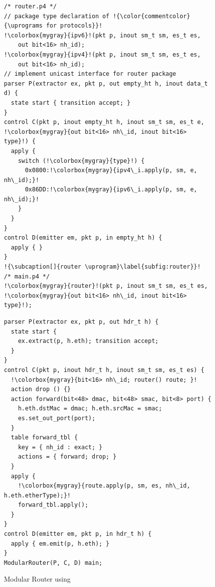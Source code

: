 \documentclass[letterpaper,twocolumn,10pt]{article}
\begin{document}
\begin{figure}[!ht]
\noindent \begin{minipage}[t]{.50\textwidth}
\begin{lstlisting}[frame=none, escapechar=!]
/* router.p4 */
// package type declaration of !{\color{commentcolor}{\uprograms for protocols}}! 
!\colorbox{mygray}{ipv6}!(pkt p, inout sm_t sm, es_t es, 
    out bit<16> nh_id);
!\colorbox{mygray}{ipv4}!(pkt p, inout sm_t sm, es_t es, 
    out bit<16> nh_id);
// implement unicast interface for router package
parser P(extractor ex, pkt p, out empty_ht h, inout data_t d) {
  state start { transition accept; }
}
control C(pkt p, inout empty_ht h, inout sm_t sm, es_t e, 
!\colorbox{mygray}{out bit<16> nh\_id, inout bit<16> type}!) {
  apply {
    switch (!\colorbox{mygray}{type}!) {
      0x0800:!\colorbox{mygray}{ipv4\_i.apply(p, sm, e, nh\_id);}!
      0x86DD:!\colorbox{mygray}{ipv6\_i.apply(p, sm, e, nh\_id);}!
    }
  }
}
control D(emitter em, pkt p, in empty_ht h) {
  apply { }
}
!{\subcaption[]{router \uprogram}\label{subfig:router}}!
/* main.p4 */
!\colorbox{mygray}{router}!(pkt p, inout sm_t sm, es_t es, 
!\colorbox{mygray}{out bit<16> nh\_id, inout bit<16> type}!);
\end{lstlisting}
\end{minipage}\hspace{-4pt}\vline
\hfill\begin{minipage}[t]{.50\textwidth}
\begin{lstlisting}[frame=none, escapechar=!]
parser P(extractor ex, pkt p, out hdr_t h) {
  state start {
    ex.extract(p, h.eth); transition accept;
  }
}
control C(pkt p, inout hdr_t h, inout sm_t sm, es_t es) {
  !\colorbox{mygray}{bit<16> nh\_id; router() route; }!
  action drop () {}           
  action forward(bit<48> dmac, bit<48> smac, bit<8> port) {
    h.eth.dstMac = dmac; h.eth.srcMac = smac;
    es.set_out_port(port);
  }
  table forward_tbl {
    key = { nh_id : exact; } 
    actions = { forward; drop; }
  }
  apply {
    !\colorbox{mygray}{route.apply(p, sm, es, nh\_id, 
h.eth.etherType);}!
    forward_tbl.apply(); 
  }
}
control D(emitter em, pkt p, in hdr_t h) {
  apply { em.emit(p, h.eth); }
}
ModularRouter(P, C, D) main;
\end{lstlisting}
\label{subfig:router-main}
\end{minipage}
\caption[]{Modular Router using \uarch \footnotemark}
\label{fig:modular-router}
\end{figure}
\end{document}
